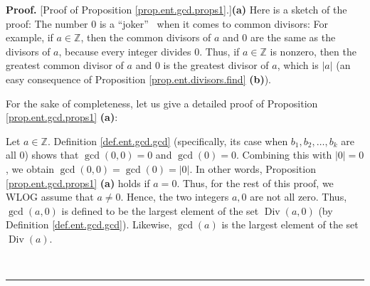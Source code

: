 \documentclass[numbers=enddot,12pt,final,onecolumn,notitlepage]{scrartcl}%
\numberwithin{exer}{subsection}
\theoremstyle{definition}
\newenvironment{fineprint}{\begin{small}}{\end{small}}
\newenvironment{proof}[1][Proof]{\noindent\textbf{#1.} }{\ \rule{0.5em}{0.5em}}
\begin{document}
\begin{proof}
[Proof of Proposition \ref{prop.ent.gcd.props1}.]\textbf{(a)} Here is a sketch
of the proof: The number $0$ is a \textquotedblleft joker\textquotedblright%
\ when it comes to common divisors: For example, if $a\in\mathbb{Z}$, then the
common divisors of $a$ and $0$ are the same as the divisors of $a$, because
every integer divides $0$. Thus, if $a\in\mathbb{Z}$ is nonzero, then the
greatest common divisor of $a$ and $0$ is the greatest divisor of $a$, which
is $\left\vert a\right\vert $ (an easy consequence of Proposition
\ref{prop.ent.divisors.find} \textbf{(b)}).

For the sake of completeness, let us give a detailed proof of Proposition
\ref{prop.ent.gcd.props1} \textbf{(a)}:

\begin{fineprint}
Let $a\in\mathbb{Z}$. Definition \ref{def.ent.gcd.gcd} (specifically, its case
when $b_{1},b_{2},\ldots,b_{k}$ are all $0$) shows that $\gcd\left(
0,0\right)  =0$ and $\gcd\left(  0\right)  =0$. Combining this with
$\left\vert 0\right\vert =0$, we obtain $\gcd\left(  0,0\right)  =\gcd\left(
0\right)  =\left\vert 0\right\vert $. In other words, Proposition
\ref{prop.ent.gcd.props1} \textbf{(a)} holds if $a=0$. Thus, for the rest of
this proof, we WLOG assume that $a\neq0$. Hence, the two integers $a,0$ are
not all zero. Thus, $\gcd\left(  a,0\right)  $ is defined to be the largest
element of the set $\operatorname*{Div}\left(  a,0\right)  $ (by Definition
\ref{def.ent.gcd.gcd}). Likewise, $\gcd\left(  a\right)  $ is the largest
element of the set $\operatorname*{Div}\left(  a\right)  $.


\end{fineprint}
\end{proof}
\end{document}
